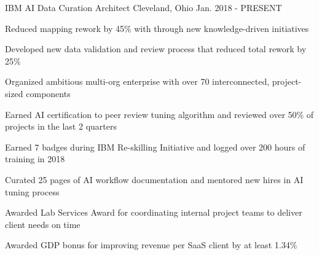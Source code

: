 

\begin{cventries}

  \cventry
    {IBM} %
    {AI Data Curation Architect} %
    {Cleveland, Ohio} %
    {Jan. 2018 - PRESENT} %
    {
      \begin{cvitems} %
        \item {Reduced mapping rework by 45\% with through new knowledge-driven initiatives}
        \item {Developed new data validation and review process that reduced total rework by 25\%}
        \item {Organized ambitious multi-org enterprise with over 70 interconnected, project-sized components}
        \item {Earned AI certification to peer review tuning algorithm and reviewed over 50\% of projects in the last 2 quarters}
        \item {Earned 7 badges during IBM Re-skilling Initiative and logged over 200 hours of training in 2018}
        \item {Curated 25 pages of AI workflow documentation and mentored new hires in AI tuning process}
        \item {Awarded Lab Services Award for coordinating internal project teams to deliver client needs on time}
        \item {Awarded GDP bonus for improving revenue per SaaS client by at least 1.34\%}
      \end{cvitems}
    }


\end{cventries}
